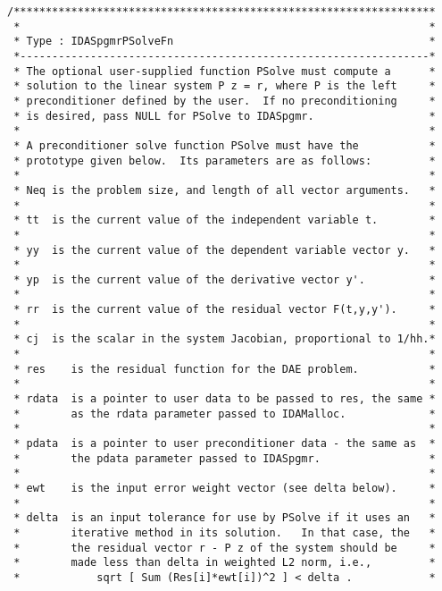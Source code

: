 \begin{verbatim}
/******************************************************************
 *                                                                *           
 * Type : IDASpgmrPSolveFn                                        *
 *----------------------------------------------------------------*
 * The optional user-supplied function PSolve must compute a      *
 * solution to the linear system P z = r, where P is the left     *
 * preconditioner defined by the user.  If no preconditioning     *
 * is desired, pass NULL for PSolve to IDASpgmr.                  *
 *                                                                *
 * A preconditioner solve function PSolve must have the           *
 * prototype given below.  Its parameters are as follows:         *
 *                                                                *
 * Neq is the problem size, and length of all vector arguments.   *
 *                                                                *
 * tt  is the current value of the independent variable t.        *
 *                                                                *
 * yy  is the current value of the dependent variable vector y.   *
 *                                                                *
 * yp  is the current value of the derivative vector y'.          *
 *                                                                *
 * rr  is the current value of the residual vector F(t,y,y').     *
 *                                                                *
 * cj  is the scalar in the system Jacobian, proportional to 1/hh.*
 *                                                                *
 * res    is the residual function for the DAE problem.           *
 *                                                                *
 * rdata  is a pointer to user data to be passed to res, the same *
 *        as the rdata parameter passed to IDAMalloc.             *
 *                                                                *
 * pdata  is a pointer to user preconditioner data - the same as  *
 *        the pdata parameter passed to IDASpgmr.                 *
 *                                                                *
 * ewt    is the input error weight vector (see delta below).     *
 *                                                                *
 * delta  is an input tolerance for use by PSolve if it uses an   *
 *        iterative method in its solution.   In that case, the   *
 *        the residual vector r - P z of the system should be     *
 *        made less than delta in weighted L2 norm, i.e.,         *
 *            sqrt [ Sum (Res[i]*ewt[i])^2 ] < delta .            *

\end{verbatim}
